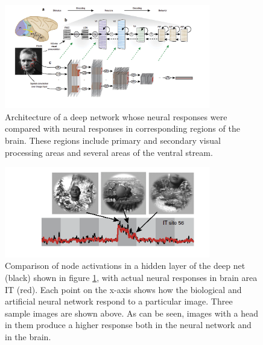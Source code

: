 \begin{figure}[h]
\centering
\includegraphics[width=0.8\textwidth]{images/deepNetYaminsArchitecture_2016.png}
\caption[Yamins.]{Architecture of a deep network whose neural responses were compared with neural responses in corresponding regions of the brain. These regions include primary and secondary visual processing areas and several areas of the ventral stream.}
\label{yamins_2016_architecture}
\end{figure}

\begin{figure}[h]
\centering
\includegraphics[width=0.8\textwidth]{images/deepNetYaminsITResponses_2016.png}
\caption[Yamins.]{Comparison of node activations in a hidden layer of the deep net (black) shown in figure \ref{yamins_2016_architecture}, with actual neural responses in brain area IT (red). Each point on the x-axis shows how the biological and artificial neural network respond to a particular image. Three sample images are shown above. As can be seen, images with a head in them produce a higher response both in the neural network and in the brain.}
\label{yamins_2016_responses}
\end{figure}

